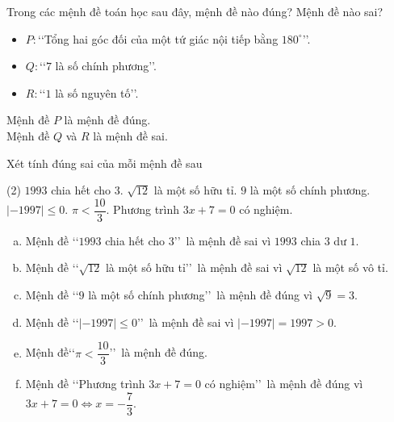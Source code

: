
\begin{baitap}%
	Trong các mệnh đề toán học sau đây, mệnh đề nào đúng? Mệnh đề nào sai?
	\begin{itemize}
		\item [a)]$P\colon$\lq\lq Tổng hai góc đối của một tứ giác nội tiếp bằng $180^{\circ}$\rq\rq.
		\item [b)]$Q\colon$\lq\lq $7$ là số chính phương\rq\rq.
		\item [c)]$R\colon$\lq\lq $1$ là số nguyên tố\rq\rq.
	\end{itemize}
	\loigiai
	{
		Mệnh đề $P$ là mệnh đề đúng. \\
		Mệnh đề $Q$ và $R$ là mệnh đề sai. \\
	}
\end{baitap}

\begin{baitap}%
	Xét tính đúng sai của mỗi mệnh đề sau
	\begin{tasks}(2)
		\task $1993$ chia hết cho $3$.
		\task $\sqrt{12}$ là một số hữu tỉ.
		\task $9$ là một số chính phương.
		\task $|-1997|\leqslant0$.
		\task $\pi<\dfrac{10}{3}$. 
		\task Phương trình $3x+7=0$ có nghiệm.
	\end{tasks}
	\loigiai
	{
		\begin{enumerate}[a)]
			\item Mệnh đề \lq\lq $1993$ chia hết cho $3$\rq\rq\ là mệnh đề sai vì $1993$ chia $3$ dư $1$.
			\item Mệnh đề \lq\lq $\sqrt{12}$ là một số hữu tỉ\rq\rq\ là mệnh đề sai vì $\sqrt{12}$ là một số vô tỉ.
			\item Mệnh đề \lq\lq $9$ là một số chính phương\rq\rq\ là mệnh đề đúng vì $\sqrt{9}=3$.
			\item Mệnh đề \lq\lq $|-1997|\leqslant0$\rq\rq\ là mệnh đề sai vì $|-1997|=1997>0$.
			\item Mệnh đề\lq\lq $\pi<\dfrac{10}{3}$\rq\rq\ là mệnh đề đúng.
			\item Mệnh đề \lq\lq Phương trình $3x+7=0$ có nghiệm\rq\rq\ là mệnh đề đúng vì $3x+7=0 \Leftrightarrow x=-\dfrac{7}{3}$.
		\end{enumerate}
	}
\end{baitap}

